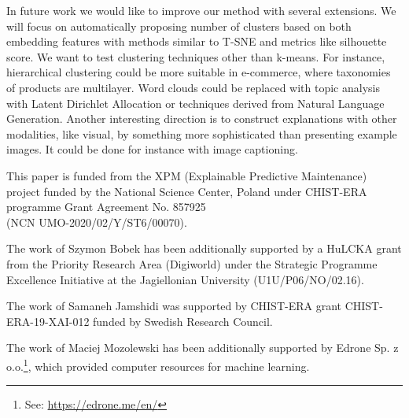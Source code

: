 \documentclass[
 twocolumn,
 hf,
]{ceurart}
\begin{document}

In future work we would like to improve our method with several extensions.
We will focus on automatically proposing number of clusters based on both embedding features with methods similar to T-SNE and metrics like silhouette score.
We want to test clustering techniques other than k-means.
For instance, hierarchical clustering could be more suitable in e-commerce, where taxonomies of products are multilayer.
Word clouds could be replaced with topic analysis with Latent Dirichlet Allocation or techniques derived from Natural Language Generation.
Another interesting direction is to construct explanations with other modalities, like visual, by something more sophisticated than presenting example images.
It could be done for instance with image captioning.


\begin{acknowledgments}
  This paper is funded from the XPM (Explainable Predictive Maintenance) project funded by the National Science Center, Poland under CHIST-ERA programme Grant Agreement No. 857925 \\ (NCN UMO-2020/02/Y/ST6/00070).

  The work of Szymon Bobek has been additionally supported by a HuLCKA grant from the Priority Research Area (Digiworld) under the Strategic Programme Excellence Initiative at the Jagiellonian University (U1U/P06/NO/02.16).

  The work of Samaneh Jamshidi was supported by CHIST-ERA grant CHIST-ERA-19-XAI-012 funded by Swedish Research Council.

  The work of Maciej Mozolewski has been additionally supported by Edrone Sp. z o.o.\footnote{See: \url{https://edrone.me/en/}}, which provided computer resources for machine learning.
\end{acknowledgments}


\end{document}
